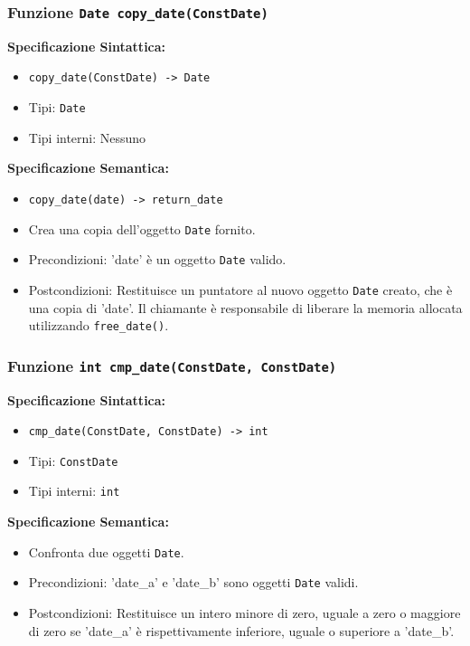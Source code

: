 \documentclass[11pt]{scrartcl} %
\begin{document}
\subsubsection{Funzione \texttt{Date copy\_date(ConstDate)}}

\textbf{Specificazione Sintattica:}
\begin{itemize}
	\item \texttt{copy\_date(ConstDate) -> Date}
	\item Tipi: \texttt{Date}
	\item Tipi interni: Nessuno
\end{itemize}

\textbf{Specificazione Semantica:}
\begin{itemize}
	\item \texttt{copy\_date(date) -> return\_date}
	\item Crea una copia dell'oggetto \texttt{Date} fornito.
	\item Precondizioni: 'date' è un oggetto \texttt{Date} valido.
	\item Postcondizioni: Restituisce un puntatore al nuovo oggetto \texttt{Date} creato, che è una copia di 'date'. Il chiamante è responsabile di liberare la memoria allocata utilizzando \texttt{free\_date()}.
\end{itemize}

\subsubsection{Funzione \texttt{int cmp\_date(ConstDate, ConstDate) }}

\textbf{Specificazione Sintattica:}
\begin{itemize}
	\item \texttt{cmp\_date(ConstDate, ConstDate) -> int}
	\item Tipi: \texttt{ConstDate}
	\item Tipi interni: \texttt{int}
\end{itemize}

\textbf{Specificazione Semantica:}
\begin{itemize}
	\item Confronta due oggetti \texttt{Date}.
	\item Precondizioni: 'date\_a' e 'date\_b' sono oggetti \texttt{Date} validi.
	\item Postcondizioni: Restituisce un intero minore di zero, uguale a zero o maggiore di zero se 'date\_a' è rispettivamente inferiore, uguale o superiore a 'date\_b'.
\end{itemize}
\end{document}
